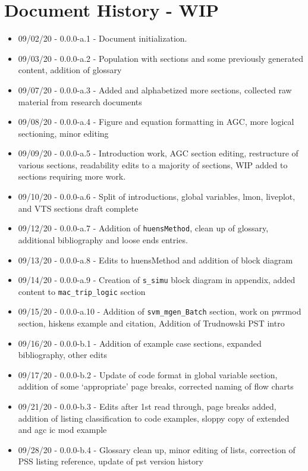 \chapter{Document History  - WIP}

\begin{itemize}
\itemsep 0em
\item 09/02/20 - 0.0.0-a.1 - Document initialization.
\item 09/03/20 - 0.0.0-a.2 - Population with sections and some previously generated content, addition of glossary
\item 09/07/20 - 0.0.0-a.3 - Added and alphabetized more sections, collected raw material from research documents
\item 09/08/20 - 0.0.0-a.4 - Figure and equation formatting in AGC, more logical sectioning, minor editing
\item 09/09/20 - 0.0.0-a.5 - Introduction work, AGC section editing, restructure of various sections, readability edits to a majority of sections, WIP added to sections requiring more work.
\item 09/10/20 - 0.0.0-a.6 - Split of introductions, global variables, lmon, liveplot, and VTS sections draft complete
\item 09/12/20 - 0.0.0-a.7 - Addition of \verb|huensMethod|, clean up of glossary, additional bibliography and loose ends entries.
\item 09/13/20 - 0.0.0-a.8 - Edits to huensMethod and addition of block diagram 
\item 09/14/20 - 0.0.0-a.9 - Creation of \verb|s_simu| block diagram in appendix, added content to \verb|mac_trip_logic| section
\item 09/15/20 - 0.0.0-a.10 - Addition of \verb|svm_mgen_Batch| section, work on pwrmod section, hiskens example and citation, Addition of Trudnowski PST intro
\item 09/16/20 - 0.0.0-b.1 - Addition of example case sections, expanded bibliography, other edits 
\item 09/17/20 - 0.0.0-b.2 - Update of code format in global variable section, addition of some `appropriate' page breaks, corrected naming of flow charts
\item 09/21/20 - 0.0.0-b.3 - Edits after 1st read through, page breaks added, addition of listing classification to code examples, sloppy copy of extended and agc ic mod example
\item 09/28/20 - 0.0.0-b.4 - Glossary clean up, minor editing of lists, correction of PSS listing reference, update of pst version history
\end{itemize}